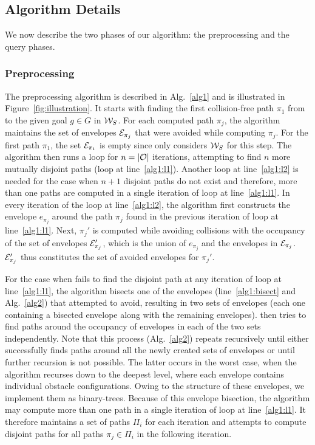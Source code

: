 \documentclass[a4paper]{report}
\begin{document}
\subsection{Algorithm Details}
We now describe the two phases of our algorithm: the preprocessing and the query phases.

\subsubsection{Preprocessing}
The preprocessing algorithm is described in Alg.~\ref{alg1} and is illustrated in Figure~\ref{fig:illustration}. It starts with finding the first collision-free path $\pi_1$ from \Sstart to the given goal $g \in G$ in $\mathcal{W}_S$. For each computed path $\pi_j$, the algorithm maintains the set of envelopes $\mathcal{E}_{\pi_j}$ that were avoided while computing $\pi_j$. For the first path $\pi_1$, the set $\mathcal{E}_{\pi_1}$ is empty since \calP only considers $\mathcal{W}_S$ for this step. The algorithm then runs a loop for $n=|\mathcal{O}|$ iterations, attempting to find $n$ more mutually disjoint paths (loop at line~\ref{alg1:l1}). Another loop at line~\ref{alg1:l2} is needed for the case when $n+1$ disjoint paths do not exist and therefore, more than one paths are computed in a single iteration of loop at line~\ref{alg1:l1}.
In every iteration of the loop at line~\ref{alg1:l2}, the algorithm first constructs the envelope $e_{\pi_j}$ around the path $\pi_j$ found in the previous iteration of loop at line~\ref{alg1:l1}. Next, $\pi_j'$ is computed while avoiding collisions with the occupancy of the set of envelopes $\mathcal{E}_{\pi_j}'$, which is the union of $e_{\pi_j}$ and the envelopes in $\mathcal{E}_{\pi_j}$. $\mathcal{E}_{\pi_j}'$ thus constitutes the set of avoided envelopes for $\pi_j'.$

For the case when \calP fails to find the disjoint path at any iteration of loop at line~\ref{alg1:l1}, the algorithm bisects one of the envelopes (line~\ref{alg1:bisect} and Alg.~\ref{alg2}) that \calP attempted to avoid, resulting in two sets of envelopes (each one containing a bisected envelope along with the remaining envelopes). \calP then tries to find paths around the occupancy of envelopes in each of the two sets independently. Note that this process (Alg.~\ref{alg2}) repeats recursively until either \calP successfully finds paths around all the newly created sets of envelopes or until further recursion is not possible. The latter occurs in the worst case, when the algorithm recurses down to the deepest level, where each envelope contains individual obstacle configurations. Owing to the structure of these envelopes, we implement them as binary-trees. Because of this envelope bisection, the algorithm may compute more than one path in a single iteration of loop at line~\ref{alg1:l1}. It therefore maintains a set of paths $\Pi_i$ for each iteration and attempts to compute disjoint paths for all paths $\pi_j \in \Pi_i$ in the following iteration.
\end{document}
